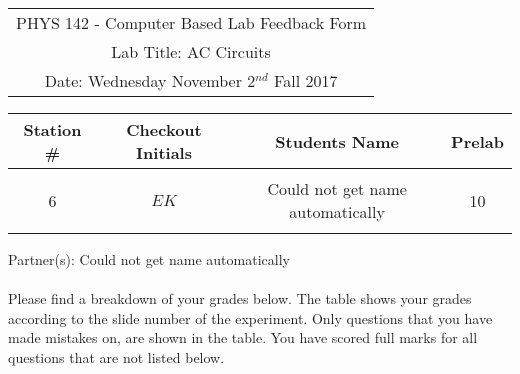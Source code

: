 \documentclass{article}
\begin{document}
\clearpage\begin{table}[h]
	\centering
	\begin{tabular}{c}
	PHYS 142 - Computer Based Lab Feedback Form\\
	Lab Title: AC Circuits\\Date: Wednesday November 2$^{nd}$ Fall 2017 \\\hline
\end{tabular}
\end{table}
\begin{table}[h]\centering \begin{tabular}{|c|c|p{9.9 cm}|c|}\hline Station \#  & Checkout Initials & \multicolumn{1}{|c|}{Students Name} & Prelab \\\hline\multirow{3}{*}{6}& \multirow{3}{*}{$EK$} & &\\& &\multicolumn{1}{|c|}{Could not get name automatically}&10\\&   &  &\\\hline
\end{tabular}
\end{table}
Partner(s): Could not get name automatically\\
\\Please find a breakdown of your grades below. The table shows your grades according to the slide number of the experiment. Only questions that you have made mistakes on, are shown in the table. You have scored full marks for all questions that are not listed below.
\end{document}
